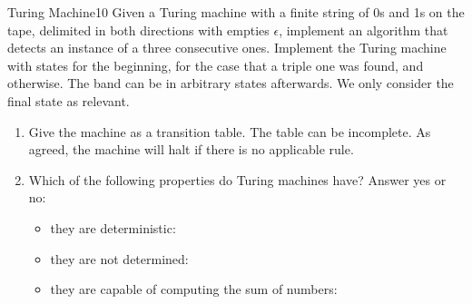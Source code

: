 \documentclass[twoside]{article}
\begin{document}
\begin{task}{Turing Machine}{10}{}
  Given a Turing machine with a finite string of 0s and 1s on the tape, delimited in both directions with empties $\epsilon$,
  implement an algorithm that detects an instance of a three consecutive ones. Implement the Turing machine with states
   for the beginning,  for the case that a triple one  was found, and  otherwise. The band can be in arbitrary states afterwards. We only consider the final state as relevant.

  \begin{enumerate}
  \item{Give the machine as a transition table. The table can be incomplete. As agreed, the machine will halt if there is no applicable rule. \vspace{10cm}}
  \item{Which of the following properties do Turing machines have? Answer yes or no:
    \begin{itemize}
    \item {they are deterministic: \vspace{1cm}}
    \item {they are not determined:\vspace{1cm}}
    \item {they are capable of computing the sum of numbers:\vspace{1cm}} 
    \end{itemize}
      }
  \end{enumerate}

  
  \end{task}
  \clearpage
  
\end{document}
